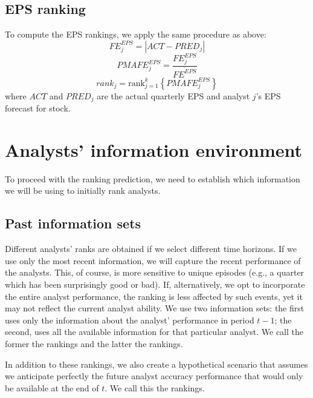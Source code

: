 \documentclass[a4paper,twoside,12pt,openright,notitlepage]{report}\usepackage[]{graphicx}\usepackage[]{color}
\begin{document}
\subsection{EPS ranking}
\label{ch4:sec-eps}
To compute the EPS rankings, we apply the same procedure as above:
\begin{equation}
	FE_{j}^{EPS}=|{ACT-PRED_{j}}|
\end{equation}
\begin{equation}
	PMAFE_{j}^{EPS}= \frac{FE_{j}^{EPS}}{\overline{FE^{EPS}}}
\end{equation}
\begin{equation}
	\label{ch4-eps:rank}
	rank_{j}=\mathrm{rank}_{j=1}^{k} \left\{ PMAFE_{j}^{EPS} \right\}
\end{equation}
where $ACT$ and $PRED_{j}$ are the actual quarterly EPS and  analyst $j$'s EPS forecast for stock.




\section{Analysts' information environment}
\label{ch4:inf-set}
To proceed with the ranking prediction, we need to establish which information we  will be using to initially rank analysts.

\subsection{Past information sets}
Different analysts' ranks are obtained  if we select different time horizons. If we use only the most  recent information, we will capture the recent performance of the analysts. This, of course, is more sensitive to unique episodes (e.g., a quarter which has been surprisingly good or bad). If, alternatively, we opt to incorporate the entire analyst performance, the ranking is less affected by such events, yet it may not reflect the current analyst ability. We use two information sets: the first uses only the  information about the analyst' performance in period $t-1$; the second, uses all the available  information for that particular analyst. We call the former the \naive{} rankings and the latter the  rankings.

In addition to these rankings,  we also create a hypothetical scenario that assumes we anticipate perfectly the future analyst accuracy performance  that would only be available at the end of $t$.
We call this the \tr{} rankings.
\end{document}
